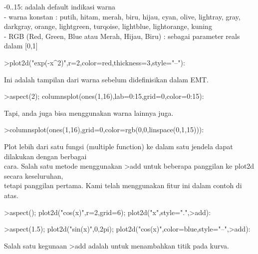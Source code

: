 \documentclass[a4paper,10pt]{article}
\begin{document}
\begin{eulernotebook}
\begin{eulercomment}
\begin{eulercomment}
\begin{eulercomment}
\begin{eulercomment}
\begin{eulercomment}
\begin{eulercomment}
\begin{eulercomment}
-0..15: adalah default indikasi warna\\
- warna konstan : putih, hitam, merah, biru, hijau, cyan, olive,
lightray, gray, darkgray, orange, lightgreen, turqoise, lightblue,
lightorange, kuning\\
- RGB (Red, Green, Blue atau Merah, Hijau, Biru) : sebagai parameter
reals dalam [0,1]
\end{eulercomment}
\begin{eulerprompt}
>plot2d("exp(-x^2)",r=2,color=red,thickness=3,style="--"):
\end{eulerprompt}
\begin{eulercomment}
Ini adalah tampilan dari warna sebelum didefinisikan dalam EMT. 
\end{eulercomment}
\begin{eulerprompt}
>aspect(2); columnsplot(ones(1,16),lab=0:15,grid=0,color=0:15):
\end{eulerprompt}
\begin{eulercomment}
Tapi, anda juga bisa menggunakan warna lainnya juga.
\end{eulercomment}
\begin{eulerprompt}
>columnsplot(ones(1,16),grid=0,color=rgb(0,0,linspace(0,1,15))):
\end{eulerprompt}
\begin{eulercomment}
Plot lebih dari satu fungsi (multiple function) ke dalam satu jendela
dapat dilakukan dengan berbagai\\
cara. Salah satu metode menggunakan \textgreater{}add untuk beberapa panggilan ke
plot2d secara keseluruhan,\\
tetapi panggilan pertama. Kami telah menggunakan fitur ini dalam
contoh di atas.
\end{eulercomment}
\begin{eulerprompt}
>aspect(); plot2d("cos(x)",r=2,grid=6); plot2d("x",style=".",>add):
\end{eulerprompt}
\begin{eulerprompt}
>aspect(1.5); plot2d("sin(x)",0,2pi); plot2d("cos(x)",color=blue,style="--",>add):
\end{eulerprompt}
\begin{eulercomment}
Salah satu kegunaan \textgreater{}add adalah untuk menambahkan titik pada kurva.

\end{eulercomment}
\end{eulercomment}
\end{eulercomment}
\end{eulercomment}
\end{eulercomment}
\end{eulercomment}
\end{eulercomment}
\end{eulernotebook}
\end{document}

